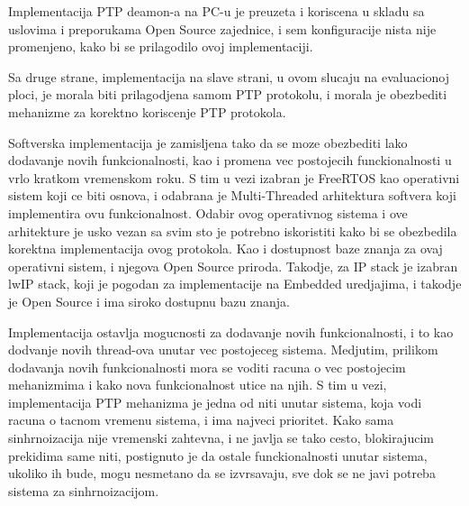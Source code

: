 \documentclass[a4paper,12pt, master]{etf}
\begin{document}
        Implementacija PTP deamon-a na PC-u je preuzeta i koriscena u skladu sa uslovima i preporukama Open
        Source zajednice, i sem konfiguracije nista nije promenjeno, kako bi se prilagodilo ovoj implementaciji.

        Sa druge strane, implementacija na slave strani, u ovom slucaju na evaluacionoj ploci, je morala biti
        prilagodjena samom PTP protokolu, i morala je obezbediti mehanizme za korektno koriscenje PTP protokola.

        Softverska implementacija je zamisljena tako da se moze obezbediti lako dodavanje novih funkcionalnosti,
        kao i promena vec postojecih funckionalnosti u vrlo kratkom vremenskom roku. S tim u vezi izabran je
        FreeRTOS kao operativni sistem koji ce biti osnova, i odabrana je Multi-Threaded arhitektura softvera
        koji implementira ovu funkcionalnost. Odabir ovog operativnog sistema i ove arhitekture je usko vezan sa
        svim sto je potrebno iskoristiti kako bi se obezbedila korektna implementacija ovog protokola. Kao i
        dostupnost baze znanja za ovaj operativni sistem, i njegova Open Source priroda. Takodje, za IP stack je
        izabran lwIP stack, koji je pogodan za implementacije na Embedded uredjajima, i takodje je Open Source i
        ima siroko dostupnu bazu znanja.

        Implementacija ostavlja mogucnosti za dodavanje novih funkcionalnosti, i to kao dodvanje novih thread-ova
        unutar vec postojeceg sistema. Medjutim, prilikom dodavanja novih funkcionalnosti mora se voditi racuna o
        vec postojecim mehanizmima i kako nova funkcionalnost utice na njih. S tim u vezi, implementacija PTP
        mehanizma je jedna od niti unutar sistema, koja vodi racuna o tacnom vremenu sistema, i ima najveci
        prioritet. Kako sama sinhrnoizacija nije vremenski zahtevna, i ne javlja se tako cesto, blokirajucim
        prekidima same niti, postignuto je da ostale funckionalnosti unutar sistema, ukoliko ih bude, mogu
        nesmetano da se izvrsavaju, sve dok se ne javi potreba sistema za sinhrnoizacijom.
\end{document}
